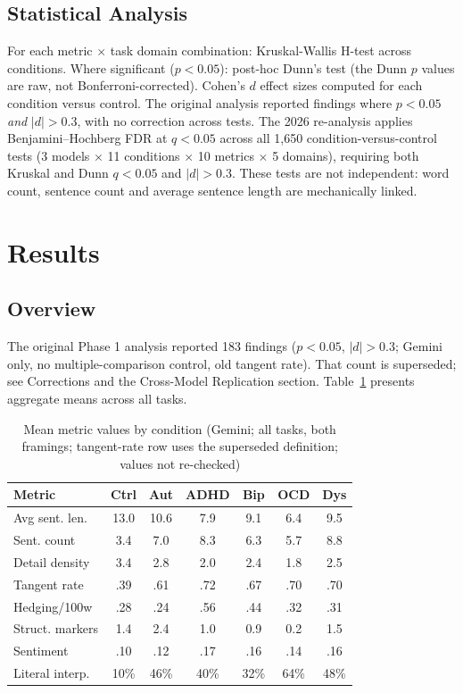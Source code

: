 \documentclass[conference]{IEEEtran}
\begin{document}
\subsection{Statistical Analysis}

For each metric $\times$ task domain combination: Kruskal-Wallis H-test across conditions. Where significant ($p < 0.05$): post-hoc Dunn's test (the Dunn $p$ values are raw, not Bonferroni-corrected). Cohen's $d$ effect sizes computed for each condition versus control. The original analysis reported findings where $p < 0.05$ \textit{and} $|d| > 0.3$, with no correction across tests. The 2026 re-analysis applies Benjamini--Hochberg FDR at $q < 0.05$ across all 1,650 condition-versus-control tests (3 models $\times$ 11 conditions $\times$ 10 metrics $\times$ 5 domains), requiring both Kruskal and Dunn $q < 0.05$ and $|d| > 0.3$. These tests are not independent: word count, sentence count and average sentence length are mechanically linked.

\section{Results}

\subsection{Overview}

The original Phase 1 analysis reported 183 findings ($p < 0.05$, $|d| > 0.3$; Gemini only, no multiple-comparison control, old tangent rate). That count is superseded; see Corrections and the Cross-Model Replication section. Table~\ref{tab:summary} presents aggregate means across all tasks.

\begin{table}[htbp]
\centering
\caption{Mean metric values by condition (Gemini; all tasks, both framings; tangent-rate row uses the superseded definition; values not re-checked)}
\label{tab:summary}
\begin{tabular}{lcccccc}
\toprule
\textbf{Metric} & \textbf{Ctrl} & \textbf{Aut} & \textbf{ADHD} & \textbf{Bip} & \textbf{OCD} & \textbf{Dys} \\
\midrule
Avg sent. len. & 13.0 & 10.6 & 7.9 & 9.1 & 6.4 & 9.5 \\
Sent. count & 3.4 & 7.0 & 8.3 & 6.3 & 5.7 & 8.8 \\
Detail density & 3.4 & 2.8 & 2.0 & 2.4 & 1.8 & 2.5 \\
Tangent rate & .39 & .61 & .72 & .67 & .70 & .70 \\
Hedging/100w & .28 & .24 & .56 & .44 & .32 & .31 \\
Struct. markers & 1.4 & 2.4 & 1.0 & 0.9 & 0.2 & 1.5 \\
Sentiment & .10 & .12 & .17 & .16 & .14 & .16 \\
Literal interp. & 10\% & 46\% & 40\% & 32\% & 64\% & 48\% \\
\bottomrule
\end{tabular}
\end{table}
\end{document}
